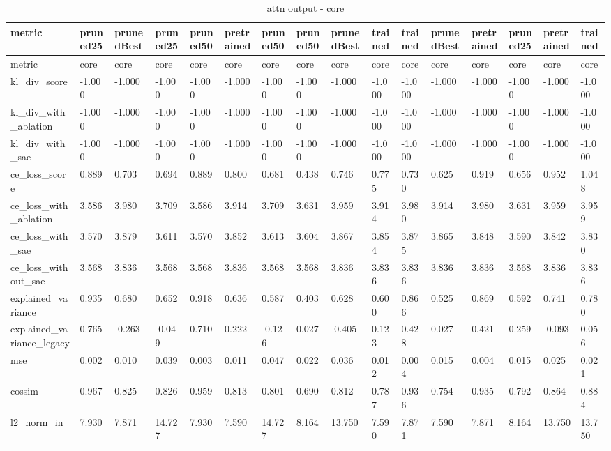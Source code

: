 \begin{table}
\caption{attn output - core}
\label{tab:attn_core}
\begin{tabular}{llllllllllllllll}
\toprule
metric & pruned25 & prunedBest & pruned25 & pruned50 & pretrained & pruned50 & pruned50 & prunedBest & trained & trained & prunedBest & pretrained & pruned25 & pretrained & trained \\
\midrule
metric & core & core & core & core & core & core & core & core & core & core & core & core & core & core & core \\
kl_div_score & -1.000 & -1.000 & -1.000 & -1.000 & -1.000 & -1.000 & -1.000 & -1.000 & -1.000 & -1.000 & -1.000 & -1.000 & -1.000 & -1.000 & -1.000 \\
kl_div_with_ablation & -1.000 & -1.000 & -1.000 & -1.000 & -1.000 & -1.000 & -1.000 & -1.000 & -1.000 & -1.000 & -1.000 & -1.000 & -1.000 & -1.000 & -1.000 \\
kl_div_with_sae & -1.000 & -1.000 & -1.000 & -1.000 & -1.000 & -1.000 & -1.000 & -1.000 & -1.000 & -1.000 & -1.000 & -1.000 & -1.000 & -1.000 & -1.000 \\
ce_loss_score & 0.889 & 0.703 & 0.694 & 0.889 & 0.800 & 0.681 & 0.438 & 0.746 & 0.775 & 0.730 & 0.625 & 0.919 & 0.656 & 0.952 & 1.048 \\
ce_loss_with_ablation & 3.586 & 3.980 & 3.709 & 3.586 & 3.914 & 3.709 & 3.631 & 3.959 & 3.914 & 3.980 & 3.914 & 3.980 & 3.631 & 3.959 & 3.959 \\
ce_loss_with_sae & 3.570 & 3.879 & 3.611 & 3.570 & 3.852 & 3.613 & 3.604 & 3.867 & 3.854 & 3.875 & 3.865 & 3.848 & 3.590 & 3.842 & 3.830 \\
ce_loss_without_sae & 3.568 & 3.836 & 3.568 & 3.568 & 3.836 & 3.568 & 3.568 & 3.836 & 3.836 & 3.836 & 3.836 & 3.836 & 3.568 & 3.836 & 3.836 \\
explained_variance & 0.935 & 0.680 & 0.652 & 0.918 & 0.636 & 0.587 & 0.403 & 0.628 & 0.600 & 0.866 & 0.525 & 0.869 & 0.592 & 0.741 & 0.780 \\
explained_variance_legacy & 0.765 & -0.263 & -0.049 & 0.710 & 0.222 & -0.126 & 0.027 & -0.405 & 0.123 & 0.428 & 0.027 & 0.421 & 0.259 & -0.093 & 0.056 \\
mse & 0.002 & 0.010 & 0.039 & 0.003 & 0.011 & 0.047 & 0.022 & 0.036 & 0.012 & 0.004 & 0.015 & 0.004 & 0.015 & 0.025 & 0.021 \\
cossim & 0.967 & 0.825 & 0.826 & 0.959 & 0.813 & 0.801 & 0.690 & 0.812 & 0.787 & 0.936 & 0.754 & 0.935 & 0.792 & 0.864 & 0.884 \\
l2_norm_in & 7.930 & 7.871 & 14.727 & 7.930 & 7.590 & 14.727 & 8.164 & 13.750 & 7.590 & 7.871 & 7.590 & 7.871 & 8.164 & 13.750 & 13.750 \\

\end{tabular}
\end{table}
